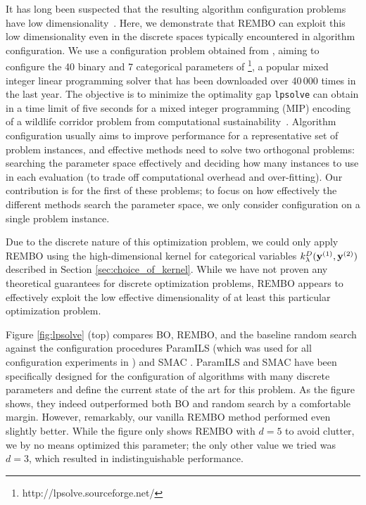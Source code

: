 \documentclass{article}
\begin{document}
It has long been suspected that the resulting algorithm configuration problems have low dimensionality~\cite{Hutter:2009}. Here, we demonstrate that REMBO can exploit this low dimensionality even in the discrete spaces typically encountered in algorithm configuration. 
We use a configuration problem obtained from \cite{Hutter:2010}, aiming to configure the 40 binary and 7 categorical parameters of \footnote{http://lpsolve.sourceforge.net/}, a popular mixed integer linear programming solver that has been downloaded over 40\,000 times in the last year.
The objective is to minimize the optimality gap \texttt{lpsolve} can obtain in a time limit of five seconds for a mixed integer programming (MIP) encoding of a wildlife corridor problem from computational sustainability~\cite{ghs08:connection}.
Algorithm configuration usually aims to improve performance for a representative set of problem instances, and effective methods need to solve two orthogonal problems: searching the parameter space effectively and deciding how many instances to use in each evaluation (to trade off computational overhead and over-fitting). Our contribution is for the first of these problems; to focus on how effectively the different methods search the parameter space, we only consider configuration on a single problem instance.

Due to the discrete nature of this optimization problem, we could only apply REMBO using the high-dimensional kernel for categorical variables $k^D_{\lambda}(\mathbf{y}^{(1)}, \mathbf{y}^{(2)})$ described in Section \ref{sec:choice_of_kernel}. While we have not proven any theoretical guarantees for discrete optimization problems, REMBO appears to effectively exploit the low effective dimensionality of at least this particular optimization problem.


Figure \ref{fig:lpsolve} (top) compares BO, REMBO, and the baseline random search against the configuration procedures ParamILS (which was used for all configuration experiments in \cite{Hutter:2010})
and SMAC \cite{Hutter:2011}. ParamILS and SMAC have been specifically designed for the configuration of algorithms with many discrete parameters and define the current state of the art for this problem. As the figure shows, they indeed outperformed both BO and random search by a comfortable margin. However, remarkably, our vanilla REMBO method performed even slightly better. While the figure only shows REMBO with $d=5$ to avoid clutter, we by no means optimized this parameter; the only other value we tried was $d=3$, which resulted in indistinguishable performance. 
\end{document}
